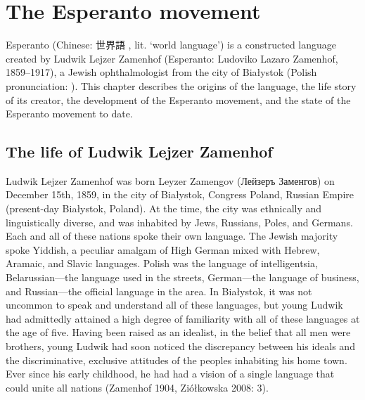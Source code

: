 \chapter{The Esperanto movement}

Esperanto (Chinese: 世界語 , lit. `world language') is a constructed language created by Ludwik Lejzer Zamenhof (Esperanto: Ludoviko Lazaro Zamenhof, 1859--1917), a Jewish ophthalmologist from the city of Białystok (Polish pronunciation: \ipa{[bjaˈwɨstɔk]}).
This chapter describes the origins of the language, the life story of its creator, the development of the Esperanto movement, and the state of the Esperanto movement to date.

\section{The life of Ludwik Lejzer Zamenhof}
Ludwik Lejzer Zamenhof was born Leyzer Zamengov ({\cyrfont Лейзеръ Заменгов\noteonrussian{}}) on December 15th, 1859, in the city of Białystok, Congress Poland, Russian Empire (present-day Białystok, Poland).
At the time, the city was ethnically and linguistically diverse, and was inhabited by Jews, Russians, Poles, and Germans.
Each and all of these nations spoke their own language.
The Jewish majority spoke Yiddish, a peculiar amalgam of High German mixed with Hebrew, Aramaic, and Slavic languages.
Polish was the language of intelligentsia, Belarussian---the language used in the streets, German---the language of business, and Russian---the official language in the area.
In Białystok, it was not uncommon to speak and understand all of these languages, but young Ludwik had admittedly attained a high degree of familiarity with all of these languages at the age of five.
Having been raised as an idealist, in the belief that all men were brothers, young Ludwik had soon noticed the discrepancy between his ideals and the discriminative, exclusive attitudes of the peoples inhabiting his home town.
Ever since his early childhood, he had had a vision of a single language that could unite all nations
(Zamenhof 1904, Ziółkowska 2008: 3).


